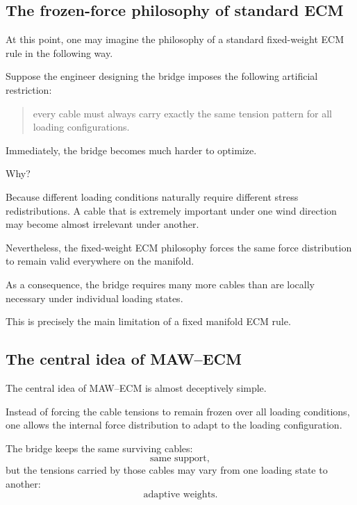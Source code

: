 \documentclass[11pt,a4paper]{article}
\begin{document}
\subsection{The frozen-force philosophy of standard ECM}

At this point, one may imagine the philosophy of a standard fixed-weight ECM
rule in the following way.

Suppose the engineer designing the bridge imposes the following artificial
restriction:
\begin{quote}
every cable must always carry exactly the same tension pattern for all loading
configurations.
\end{quote}

Immediately, the bridge becomes much harder to optimize.

Why?

Because different loading conditions naturally require different stress
redistributions. A cable that is extremely important under one wind direction
may become almost irrelevant under another.

Nevertheless, the fixed-weight ECM philosophy forces the same force
distribution to remain valid everywhere on the manifold.

As a consequence, the bridge requires many more cables than are locally
necessary under individual loading states.

This is precisely the main limitation of a fixed manifold ECM rule.

\subsection{The central idea of MAW--ECM}

The central idea of MAW--ECM is almost deceptively simple.

Instead of forcing the cable tensions to remain frozen over all loading
conditions, one allows the internal force distribution to adapt to the loading
configuration.

The bridge keeps the same surviving cables:
\[
        \text{same support},
\]
but the tensions carried by those cables may vary from one loading state to
another:
\[
        \text{adaptive weights}.
\]
\end{document}
